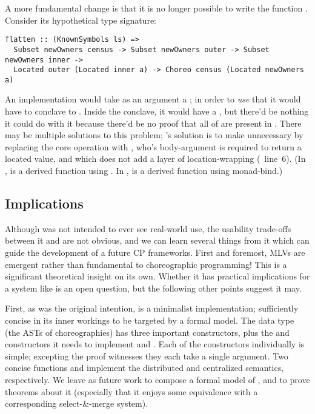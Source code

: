 A more fundamental change is that it is no longer possible to write the function .
Consider its hypothetical type signature:
\begin{verbatim}
flatten :: (KnownSymbols ls) =>
  Subset newOwners census -> Subset newOwners outer -> Subset newOwners inner ->
  Located outer (Located inner a) -> Choreo census (Located newOwners a)
\end{verbatim}
An implementation would take as an argument a ;
in order to \emph{use} that it would have to conclave to .
Inside the conclave, it would have a ,
but there'd be nothing it could do with it because there'd be no proof that all of  are present in .
There may be multiple solutions to this problem; \minichor's solution is to make  unnecessary
by replacing the core operation  with ,
who's body-argument is required to return a located value, and which does not add a layer of location-wrapping
(~line~6).
(In \MultiChor,  is a derived function using .
In \minichor,  is a derived function using monad-bind.)


\subsection{Implications}
\label{sec:minichor-implications}
Although \minichor was not intended to ever see real-world use,
the usability trade-offs between it and \MultiChor are not obvious,
and we can learn several things from it which can guide the development of a future CP frameworks.
First and foremost, MLVs are emergent rather than fundamental to choreographic programming!
This is a significant theoretical insight on its own.
Whether it has practical implications for a system like \MultiChor is an open question,
but the following other points suggest it may.

First, as was the original intention, \minichor is a minimalist implementation;
sufficiently concise in its inner workings to be targeted by a formal model.
The  data type (the ASTs of choreographies) has three important constructors,
plus the  and  constructors it needs to implement  and .
Each of the constructors individually is simple;
excepting the proof witnesses they each take a single argument.
Two concise functions  and  implement the distributed and centralized semantics, respectively.
We leave as future work to compose a formal model of \minichor,
and to prove theorems about it
(especially that it enjoys some equivalence with a corresponding select-\&-merge system).
 
